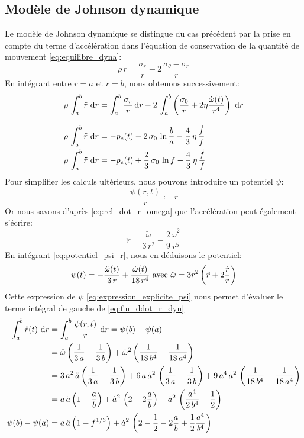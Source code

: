 \documentclass[10pt]{book}
\newcommand{\Int}[2]{\int_{#1}^{#2}}
\begin{document}
\subsection{Modèle de Johnson dynamique}
Le modèle de Johnson dynamique se distingue du cas précédent par la prise en compte du terme d’accélération dans l'équation de conservation de la quantité de mouvement \eqref{eq:equilibre_dyna}:
$$\rho\,\ddot{r}  = \dfrac{\sigma_r}{r} -2\, \dfrac{\sigma_\theta-\sigma_r}{r}$$
En intégrant entre $r=a$ et $r=b$, nous obtenons successivement:
\begin{align} 
\rho \, \Int{a}{b} \ddot{r} \, \dr & =\Int{a}{b} \dfrac{\sigma_r}{r} \dr -2 \, \Int{a}{b}\pa{\dfrac{\sigma_0}{r}+2 \eta \dfrac{\dot{\omega}(t)}{r^4} }\, \dr \\[3mm]
\rho \, \Int{a}{b} \ddot{r} \,  \dr & = -p_e(t) - 2 \,\sigma_0 \,\ln{\dfrac{b}{a}} - \dfrac{4}{3}\,\eta\,\dfrac{\dot{f}}{f}\\
\rho \, \Int{a}{b}\ddot{r} \,  \dr & = -p_e(t) + \dfrac{2}{3} \,\sigma_0 \,\ln{f} - \dfrac{4}{3}\,\eta\,\dfrac{\dot{f}}{f} \label{eq:fin_ddot_r_dyn}
\end{align}
Pour simplifier les calculs ultérieurs, nous pouvons introduire un potentiel $\psi$:
\begin{equation}
\dfrac{\psi(r,t)}{r}:=\ddot{r}
\label{eq:potentiel_psi_r}
\end{equation}
Or nous savons d'après \eqref{eq:rel_dot_r_omega} que l’accélération peut également s'écrire:
$$\ddot{r}=\dfrac{\ddot{\omega}}{3\,r^2}-\dfrac{2}{9}\dfrac{\dot{\omega}^2}{r^5}$$
En intégrant \eqref{eq:potentiel_psi_r}, nous en déduisons le potentiel: 
\begin{equation}
\psi(t)=-\dfrac{\ddot{\omega}(t)}{3\,r}+\dfrac{\dot{\omega}(t)}{18\,r^4} \text{ avec } \ddot{\omega}=3r^2\left(\ddot{r}+2\dfrac{\dot{r}}{r}\right)
\label{eq:expression_explicite_psi}
\end{equation}
Cette expression de $\psi$ \eqref{eq:expression_explicite_psi} nous permet d'évaluer le terme intégral de gauche de \eqref{eq:fin_ddot_r_dyn}
$$\begin{aligned}
\Int{a}{b} \ddot{r}(t)\,  \dr &= \Int{a}{b}\dfrac{\psi(r,t)}{r} \,  \dr = \psi(b)-\psi(a)\\
&= \ddot{\omega}\pa{\dfrac{1}{3\,a}-\dfrac{1}{3\,b}}+\dot{\omega}^2\pa{\dfrac{1}{18\,b^4}-\dfrac{1}{18\,a^4}}\\
&= 3\,a^2\,\ddot{a}\pa{\dfrac{1}{3\,a}-\dfrac{1}{3\,b}}+6\,a\,\dot{a}^2\,\pa{\dfrac{1}{3\,a}-\dfrac{1}{3\,b}}+9\,a^4\,\dot{a}^2\,\pa{\dfrac{1}{18\,b^4}-\dfrac{1}{18\,a^4}}\\
&= a\,\ddot{a}\pa{1-\dfrac{a}{b}}+\dot{a}^2\,\pa{2-2\dfrac{a}{b}}+\dot{a}^2\,\pa{\dfrac{a^4}{2\,b^4}-\dfrac{1}{2}}\\
\psi(b)-\psi(a) &= a\,\ddot{a}\pa{1-f^{1/3}}+\dot{a}^2\,\pa{2-\dfrac{1}{2}-2\dfrac{a}{b}+\dfrac{1}{2}\dfrac{a^4}{b^4}}
\end{aligned}$$
\end{document}
